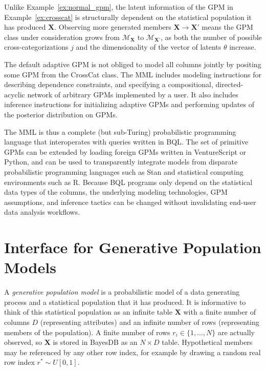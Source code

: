 \documentclass[10pt,letterpaper]{article}
\newcommand{\set}[1]{\{#1\}}
\begin{document}
Unlike Example~\ref{ex:normal_gpm}, the latent information of the GPM
in Example~\ref{ex:crosscat} is structurally dependent on
the statistical population it has produced $\mathbf{X}$. Observing more
generated members $\mathbf{X} \to
\mathbf{X}'$ means the GPM class under consideration grows from
$\mathcal{M}_\textbf{X}$ to $\mathcal{M}_\textbf{X'}$, as both the number of
possible cross-categorizations $j$ and the dimensionality of the vector of
latents $\theta$ increase.


The default adaptive GPM is not obliged to model all columns jointly by
positing some GPM from the CrossCat class. The MML includes modeling
instructions for describing dependence constraints, and specifying a
compositional, directed-acyclic network of arbitrary GPMs implemented by a user.
It also includes inference instructions for initializing adaptive GPMs and
performing updates of the posterior distribution on GPMs.

The MML is thus a complete (but sub-Turing) probabilistic programming language
that interoperates with queries written in BQL. The set of primitive GPMs can be
extended by loading foreign GPMs written in VentureScript or Python, and can be used to
transparently integrate models from disparate probabilistic programming
languages such as Stan and statistical computing environments such as R. Because
BQL programs only depend on the statistical data types of the columns, the
underlying modeling technologies, GPM assumptions, and inference tactics can be
changed without invalidating end-user data analysis workflows.

\section{Interface for Generative Population Models} \label{sec:generators}
A \textit{generative population model} is a probabilistic model of a data
generating process and a statistical population that it has produced. It is
informative to think of this statistical population as an infinite table
$\mathbf{X}$ with a finite number of columns $D$ (representing attributes) and
an infinite number of rows (representing members of the population). A finite
number of rows $r_i \in
\set{1,\dots,N}$ are actually observed, so $\mathbf{X}$ is stored in BayesDB as
an $N \times D$ table. Hypothetical members may be referenced by any other row index,
for example by drawing a random real row index
$r^*\sim U[0,1]$.
\end{document}
